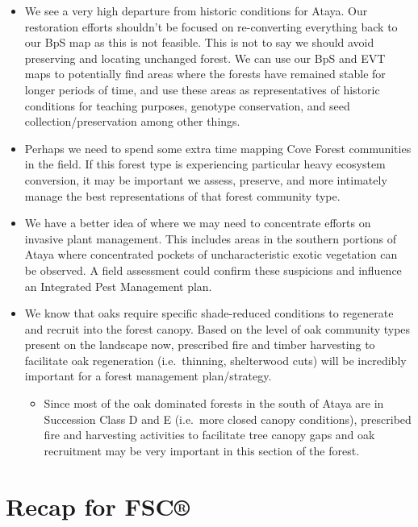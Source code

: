 \documentclass[
]{book}
\providecommand{\tightlist}{%
  \setlength{\itemsep}{0pt}\setlength{\parskip}{0pt}}
\begin{document}
\begin{itemize}
\tightlist
\item
  We see a very high departure from historic conditions for Ataya. Our restoration efforts shouldn't be focused on re-converting everything back to our BpS map as this is not feasible. This is not to say we should avoid preserving and locating unchanged forest. We can use our BpS and EVT maps to potentially find areas where the forests have remained stable for longer periods of time, and use these areas as representatives of historic conditions for teaching purposes, genotype conservation, and seed collection/preservation among other things.\\
\item
  Perhaps we need to spend some extra time mapping Cove Forest communities in the field. If this forest type is experiencing particular heavy ecosystem conversion, it may be important we assess, preserve, and more intimately manage the best representations of that forest community type.
\item
  We have a better idea of where we may need to concentrate efforts on invasive plant management. This includes areas in the southern portions of Ataya where concentrated pockets of uncharacteristic exotic vegetation can be observed. A field assessment could confirm these suspicions and influence an Integrated Pest Management plan.
\item
  We know that oaks require specific shade-reduced conditions to regenerate and recruit into the forest canopy. Based on the level of oak community types present on the landscape now, prescribed fire and timber harvesting to facilitate oak regeneration (i.e.~thinning, shelterwood cuts) will be incredibly important for a forest management plan/strategy.

  \begin{itemize}
  \tightlist
  \item
    Since most of the oak dominated forests in the south of Ataya are in Succession Class D and E (i.e.~more closed canopy conditions), prescribed fire and harvesting activities to facilitate tree canopy gaps and oak recruitment may be very important in this section of the forest.
  \end{itemize}
\end{itemize}

\hypertarget{recap-for-fsc}{%
\section{Recap for FSC®}\label{recap-for-fsc}}
\end{document}
